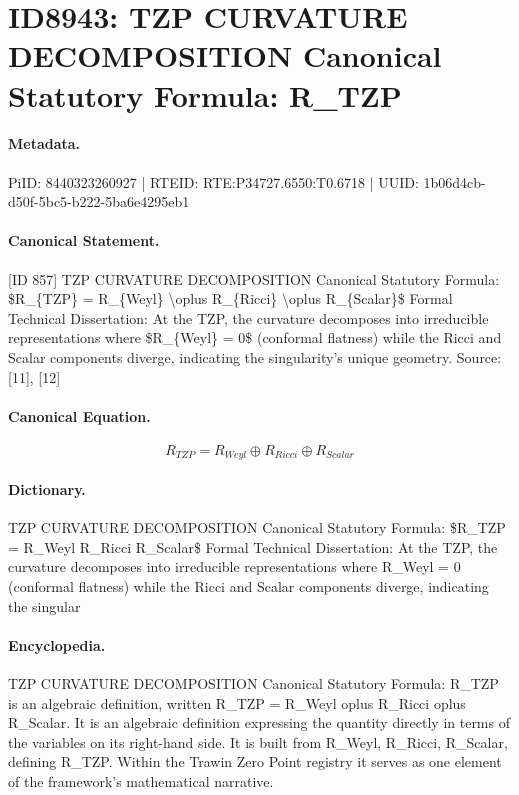 \section*{ID8943: TZP CURVATURE DECOMPOSITION Canonical Statutory Formula: R\_TZP}
\paragraph{Metadata.}
PiID: 8440323260927 | RTEID: RTE:P34727.6550:T0.6718 | UUID: 1b06d4cb-d50f-5bc5-b222-5ba6e4295eb1

\paragraph{Canonical Statement.}
[ID 857] TZP CURVATURE DECOMPOSITION Canonical Statutory Formula: \$R\_\{TZP\} = R\_\{Weyl\} \textbackslash{}oplus R\_\{Ricci\} \textbackslash{}oplus R\_\{Scalar\}\$ Formal Technical Dissertation: At the TZP, the curvature decomposes into irreducible representations where \$R\_\{Weyl\} = 0\$ (conformal flatness) while the Ricci and Scalar components diverge, indicating the singularity's unique geometry. Source: [11], [12]

\paragraph{Canonical Equation.}
\[
R_{TZP} = R_{Weyl} \oplus R_{Ricci} \oplus R_{Scalar}
\]

\paragraph{Dictionary.}
TZP CURVATURE DECOMPOSITION Canonical Statutory Formula: \$R\_TZP = R\_Weyl R\_Ricci R\_Scalar\$ Formal Technical Dissertation: At the TZP, the curvature decomposes into irreducible representations where R\_Weyl = 0 (conformal flatness) while the Ricci and Scalar components diverge, indicating the singular

\paragraph{Encyclopedia.}
TZP CURVATURE DECOMPOSITION Canonical Statutory Formula: R\_TZP is an algebraic definition, written R\_TZP = R\_Weyl oplus R\_Ricci oplus R\_Scalar. It is an algebraic definition expressing the quantity directly in terms of the variables on its right-hand side. It is built from R\_Weyl, R\_Ricci, R\_Scalar, defining R\_TZP. Within the Trawin Zero Point registry it serves as one element of the framework's mathematical narrative.
